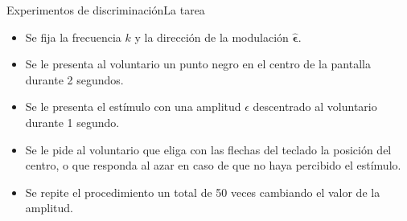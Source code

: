 \documentclass[
    11pt, %
    aspectratio=169, %
]{beamer}
\begin{document}
\begin{frame}{Experimentos de discriminación}{La tarea}
    \begin{itemize}
        \item Se fija la frecuencia $k$ y la dirección de la modulación $\bm{\hat{\epsilon}}$.\pause
        \item Se le presenta al voluntario un punto negro en el centro de la pantalla durante 2 segundos.\pause
        \item Se le presenta el estímulo con una amplitud $\epsilon$ descentrado al voluntario durante 1 segundo.\pause
        \item Se le pide al voluntario que eliga con las flechas del teclado la posición del centro, o que responda al azar en caso de que no haya percibido el estímulo. \pause
        \item Se repite el procedimiento un total de 50 veces cambiando el valor de la amplitud.
    \end{itemize}        
\end{frame}
\end{document}
